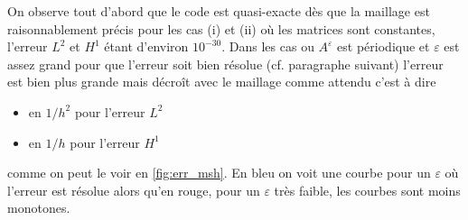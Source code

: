 \documentclass[11pt]{article}
\begin{document}
On observe tout d'abord que le code est quasi-exacte dès que la maillage est raisonnablement précis pour les cas (i) et (ii) où les matrices sont
constantes, l'erreur $L^2$ et $H^1$ étant d'environ $10^{-30}$.
Dans les cas ou $A^\varepsilon$ est périodique et $\varepsilon$ est assez grand pour que l'erreur soit bien résolue (cf. paragraphe suivant) l'erreur est bien plus grande mais décroît avec le maillage comme attendu c'est à dire
\begin{itemize}
\item en $1/h^2$ pour l'erreur $L^2$
\item en $1/h$ pour l'erreur $H^1$
\end{itemize}
comme on peut le voir en \autoref{fig:err_msh}. En bleu on voit une courbe pour un $\varepsilon$ où l'erreur est résolue alors qu'en rouge, pour un $\varepsilon$ très
faible, les courbes sont moins monotones. 
\end{document}
